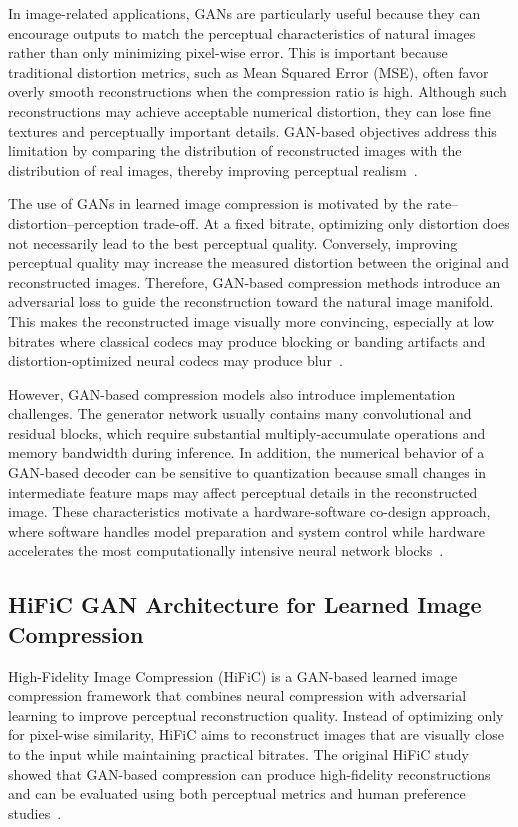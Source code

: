 In image-related applications, GANs are particularly useful because they can encourage outputs to match the perceptual characteristics of natural images rather than only minimizing pixel-wise error. This is important because traditional distortion metrics, such as Mean Squared Error (MSE), often favor overly smooth reconstructions when the compression ratio is high. Although such reconstructions may achieve acceptable numerical distortion, they can lose fine textures and perceptually important details. GAN-based objectives address this limitation by comparing the distribution of reconstructed images with the distribution of real images, thereby improving perceptual realism~\cite{blau2018perception,mentzer2020high}.

The use of GANs in learned image compression is motivated by the rate--distortion--perception trade-off. At a fixed bitrate, optimizing only distortion does not necessarily lead to the best perceptual quality. Conversely, improving perceptual quality may increase the measured distortion between the original and reconstructed images. Therefore, GAN-based compression methods introduce an adversarial loss to guide the reconstruction toward the natural image manifold. This makes the reconstructed image visually more convincing, especially at low bitrates where classical codecs may produce blocking or banding artifacts and distortion-optimized neural codecs may produce blur~\cite{blau2018perception,mentzer2020high}.

However, GAN-based compression models also introduce implementation challenges. The generator network usually contains many convolutional and residual blocks, which require substantial multiply-accumulate operations and memory bandwidth during inference. In addition, the numerical behavior of a GAN-based decoder can be sensitive to quantization because small changes in intermediate feature maps may affect perceptual details in the reconstructed image. These characteristics motivate a hardware-software co-design approach, where software handles model preparation and system control while hardware accelerates the most computationally intensive neural network blocks~\cite{mentzer2020high,sze2017efficient}.

\subsection{HiFiC GAN Architecture for Learned Image Compression}

High-Fidelity Image Compression (HiFiC) is a GAN-based learned image compression framework that combines neural compression with adversarial learning to improve perceptual reconstruction quality. Instead of optimizing only for pixel-wise similarity, HiFiC aims to reconstruct images that are visually close to the input while maintaining practical bitrates. The original HiFiC study showed that GAN-based compression can produce high-fidelity reconstructions and can be evaluated using both perceptual metrics and human preference studies~\cite{mentzer2020high}.

